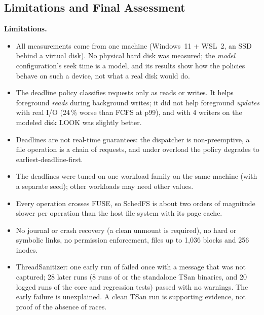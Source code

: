 \documentclass[12pt,a4paper]{article}
\DeclareRobustCommand{\code}[1]{\texttt{\detokenize{#1}}}
\begin{document}
\subsection{Limitations and Final Assessment}
\label{sec:limits}
\textbf{Limitations.}
\begin{itemize}[leftmargin=1.4em]
  \item All measurements come from one machine (Windows~11 + WSL~2, an SSD behind a virtual disk). No physical hard disk was measured; the \emph{model} configuration's seek time is a model, and its results show how the policies behave on such a device, not what a real disk would do.
  \item The deadline policy classifies requests only as reads or writes. It helps foreground \emph{reads} during background writes; it did not help foreground \emph{updates} with real I/O (24\,\% worse than FCFS at p99), and with 4 writers on the modeled disk LOOK was slightly better.
  \item Deadlines are not real-time guarantees: the dispatcher is non-preemptive, a file operation is a chain of requests, and under overload the policy degrades to earliest-deadline-first.
  \item The deadlines were tuned on one workload family on the same machine (with a separate seed); other workloads may need other values.
  \item Every operation crosses FUSE, so SchedFS is about two orders of magnitude slower per operation than the host file system with its page cache.
  \item No journal or crash recovery (a clean unmount is required), no hard or symbolic links, no permission enforcement, files up to 1{,}036 blocks and 256 inodes.
  \item ThreadSanitizer: one early run of \code{make tsan} failed once with a message that was not captured; 28 later runs (8 runs of \code{make tsan} or the standalone TSan binaries, and 20 logged runs of the core and regression tests) passed with no warnings. The early failure is unexplained. A clean TSan run is supporting evidence, not proof of the absence of races.
\end{itemize}
\end{document}
